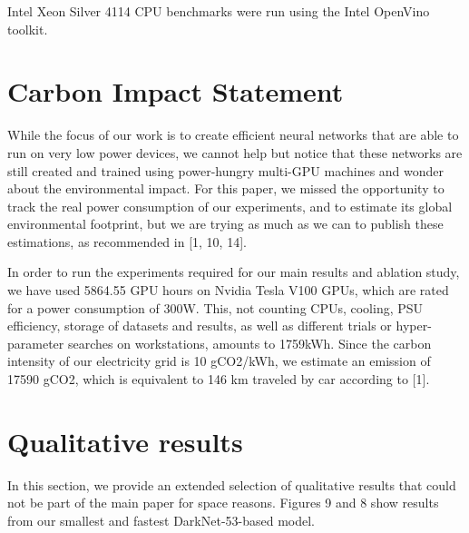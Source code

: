 \documentclass[10pt,twocolumn]{article}
\begin{document}
Intel Xeon Silver 4114 CPU benchmarks were run using
the Intel OpenVino toolkit.

\section{Carbon Impact Statement}

While the focus of our work is to create efficient neural
networks that are able to run on very low power devices, we
cannot help but notice that these networks are still created
and trained using power-hungry multi-GPU machines and
wonder about the environmental impact. For this paper, we
missed the opportunity to track the real power consumption
of our experiments, and to estimate its global environmental
footprint, but we are trying as much as we can to publish
these estimations, as recommended in [1, 10, 14].

In order to run the experiments required for our main results
and ablation study, we have used 5864.55 GPU hours
on Nvidia Tesla V100 GPUs, which are rated for a power
consumption of 300W. This, not counting CPUs, cooling,
PSU efficiency, storage of datasets and results, as well as
different trials or hyper-parameter searches on workstations,
amounts to 1759kWh. Since the carbon intensity of our
electricity grid is 10 gCO2/kWh, we estimate an emission
of 17590 gCO2, which is equivalent to 146 km traveled by
car according to [1].

\section{Qualitative results}

In this section, we provide an extended selection of qualitative
results that could not be part of the main paper for
space reasons. Figures 9 and 8 show results from our smallest
and fastest DarkNet-53-based model.
\end{document}
